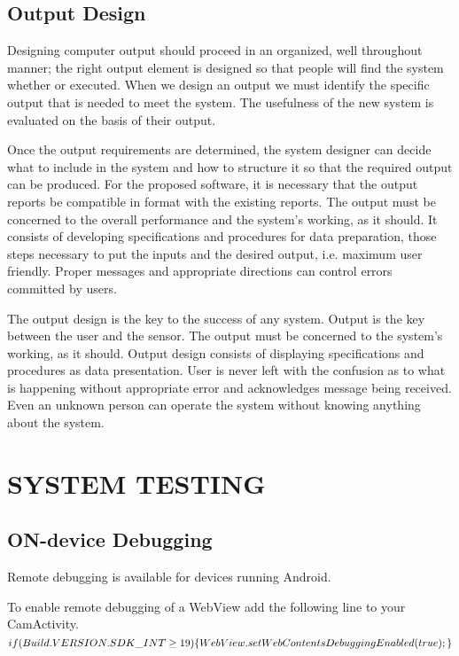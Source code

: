 \documentclass{article}
\begin{document}
\subsection{ Output Design }
\par Designing computer output should proceed in an organized, well throughout manner; the right output element is designed so that people will find the system whether or executed. When we design an output we must identify the specific output that is needed to meet the system. The usefulness of the new system is evaluated on the basis of their output. 
\par Once the output requirements are determined, the system designer can decide what to include in the system and how to structure it so that the required output can be produced. For the proposed software, it is necessary that the output reports be compatible in format with the existing reports. The output must be concerned to the overall performance and the system’s working, as it should. It consists of developing specifications and procedures for data preparation, those steps necessary to put the inputs and the desired output, i.e. maximum user friendly. Proper messages and appropriate directions can control errors committed by users.
\par The output design is the key to the success of any system. Output is the key between the user and the sensor. The output must be concerned to the system’s working, as it should. Output design consists of displaying specifications and procedures as data presentation. User is never left with the confusion as to what is happening without appropriate error and acknowledges message being received. Even an unknown person can operate the system without knowing anything about the system. 



\newpage
\section{SYSTEM TESTING }
\subsection{ \textbf{ON-device Debugging }}
\par Remote debugging is available for devices running Android.
\par{ To enable remote debugging of a WebView add the following line to your CamActivity. }\\[.3cm]
$if(Build.VERSION.SDK\_INT \geq 19) \{\\
WebView.setWebContentsDebuggingEnabled(true);\\
\} $
\end{document}
